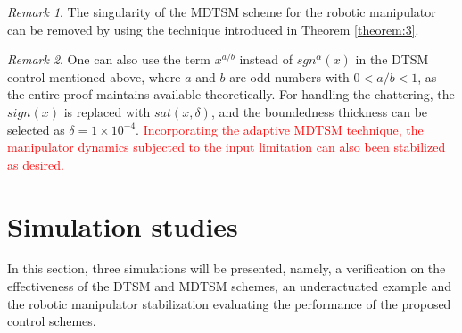 \documentclass[3p]{elsarticle}
\theoremstyle{plain}
\theoremstyle{remark}
\newtheorem{myrem}{Remark}
\begin{document}
\begin{myrem}
The singularity of the MDTSM scheme for the robotic manipulator can be removed by using the technique introduced in Theorem \ref{theorem:3}.
\end{myrem}
\begin{myrem}
One can also use the term $x^{a/b}$ instead of $sgn^\alpha(x)$ in the DTSM control mentioned above, where $a$ and $b$ are odd numbers with $0<a/b<1$, as the entire proof maintains available theoretically. For handling the chattering, the $sign(x)$ is replaced with $sat(x,\delta)$, and the boundedness thickness can be selected as $\delta=1\times 10^{-4}$. \textcolor{red}{Incorporating the adaptive MDTSM technique, the manipulator dynamics subjected to the input limitation can also been stabilized as desired.}
\end{myrem}
\section{Simulation studies}\label{sec:4}
In this section, three simulations will be presented, namely, a verification on the effectiveness of the DTSM and MDTSM schemes, an underactuated example and the robotic manipulator stabilization evaluating the performance of the proposed control schemes.
\end{document}
